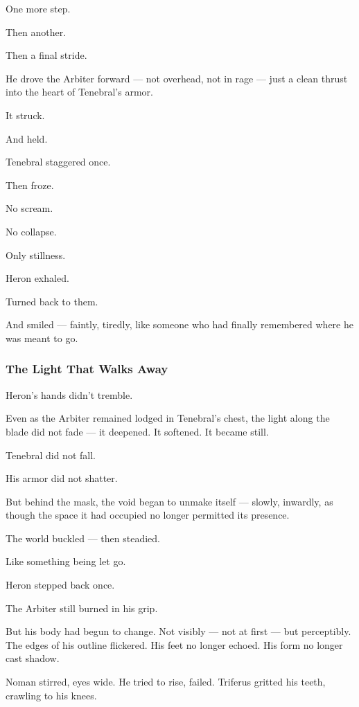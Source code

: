 \documentclass[12pt]{article}
\begin{document}
One more step.

Then another.

Then a final stride.

He drove the Arbiter forward — not overhead, not in rage — just a clean thrust into the heart of Tenebral’s armor.

It struck.

And held.

\bigskip

Tenebral staggered once.

Then froze.

No scream.

No collapse.

Only stillness.

Heron exhaled.

Turned back to them.

And smiled — faintly, tiredly, like someone who had finally remembered where he was meant to go.

\dotfill

\subsubsection{The Light That Walks Away}

Heron’s hands didn’t tremble.

Even as the Arbiter remained lodged in Tenebral’s chest, the light along the blade did not fade — it deepened. It softened. It became still.

Tenebral did not fall.

His armor did not shatter.

But behind the mask, the void began to unmake itself — slowly, inwardly, as though the space it had occupied no longer permitted its presence.

The world buckled — then steadied.

Like something being let go.

\bigskip

Heron stepped back once.

The Arbiter still burned in his grip.

But his body had begun to change. Not visibly — not at first — but perceptibly. The edges of his outline flickered. His feet no longer echoed. His form no longer cast shadow.

Noman stirred, eyes wide. He tried to rise, failed. Triferus gritted his teeth, crawling to his knees.

\bigskip
\end{document}
